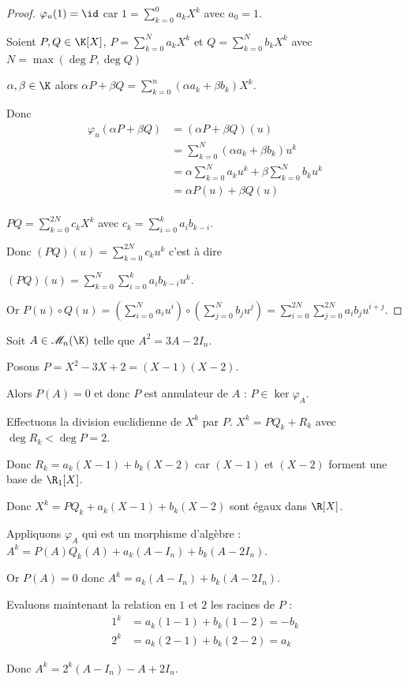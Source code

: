 \begin{proof}
    $\varphi_u(1) = \id$ car $\displaystyle 1 = \sum_{k = 0 }^{ 0 } a_k X^k$ avec $a_0 = 1$.

    Soient $P, Q \in \K[X]$, $\displaystyle P = \sum_{k = 0 }^{ N } a_k X^k$ et $\displaystyle Q = \sum_{k = 0 }^{ N} b_k X^k$
    avec $N = \max(\deg P, \deg Q)$ 

    $\alpha, \beta \in \K$ alors $\displaystyle\alpha P + \beta Q = \sum_{k = 0 }^{n } (\alpha a_k + \beta b_k) X^k$.

    Donc 
    \begin{align}
        \varphi_u(\alpha P + \beta Q) & = (\alpha P + \beta Q)(u) \\
        & = \sum_{k = 0 }^{ N } (\alpha a_k + \beta b_k) u^k \\
        & = \alpha \sum_{k = 0 }^{ N } a_k u^k + \beta \sum_{k = 0 }^{ N } b_k u^k \\
        & = \alpha P(u) + \beta Q(u) \\
    \end{align}

    $\displaystyle PQ = \sum_{k = 0 }^{ 2N } c_k X^k$ avec $\displaystyle c_k = \sum_{i = 0 }^{ k } a_i b_{k - i}$.

    Donc $\displaystyle (PQ)(u) = \sum_{k = 0 }^{ 2N } c_k u^k$ c'est à dire 

    $\displaystyle (PQ)(u) = \sum_{k = 0 }^{ N} \sum_{i = 0 }^{k } a_i b_{k - i} u^k$.

    Or $\displaystyle P(u) \circ Q(u) = (\sum_{i = 0 }^{ N } a_i u^i)\circ( \sum_{j = 0 }^{ N } b_j u^j)
    = \sum_{i = 0 }^{ 2N} \sum_{j = 0 }^{2N } a_i b_j u^{i + j}$.
\end{proof}



\begin{exemple}
    Soit $A \in \mathscr M_n(\K)$ telle que $A^2 = 3A - 2 I_n$. 

    Posons $P = X^2 - 3X + 2 = (X - 1)(X - 2)$.

    Alors $P(A) = 0$ et donc $P$ est annulateur de $A$ : $P \in \ker \varphi_A$.

    Effectuons la division euclidienne de $X^k$ par $P$. $X^k = PQ_k + R_k$ avec 
    $\deg R_k < \deg P = 2$.

    Donc $R_k = a_k(X - 1) + b_k (X - 2)$ car $(X - 1)$ et $(X - 2)$ forment une base de $\R_1[X]$.

    Donc $X^k = P Q_k + a_k (X - 1) + b_k (X - 2)$ sont égaux dans $\R[X]$. 

    Appliquons $\varphi_A$ qui est un morphisme d'algèbre : $A^k = P(A) Q_k(A) + a_k (A - I_n) + b_k (A - 2 I_n)$.

    Or $P(A) = 0$ donc $A^k = a_k (A - I_n) + b_k (A - 2 I_n)$.

    Evaluons maintenant la relation en $1$ et $2$ les racines de $P$ : 
    \begin{align}
        1^k & = a_k (1 - 1) + b_k (1 - 2) = -b_k \\
        2^k & = a_k (2 - 1) + b_k (2 - 2) = a_k
    \end{align}

    Donc $A^k = 2^k (A - I_n) - A + 2 I_n$.
\end{exemple}


